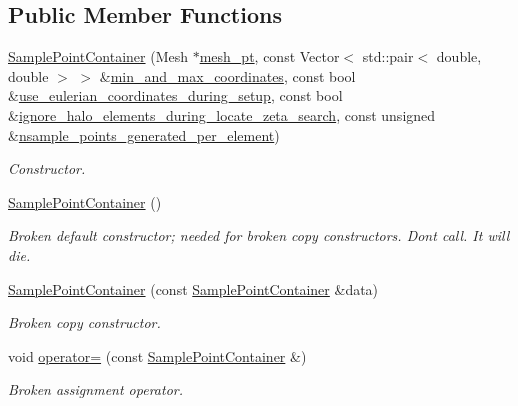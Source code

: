 \subsection*{Public Member Functions}
\begin{DoxyCompactItemize}
\item 
\hyperlink{classSamplePointContainer_a68326e89f80f01690d8c2d03effb8508}{Sample\+Point\+Container} (Mesh $\ast$\hyperlink{classSamplePointContainer_ae170916821b5f8f00255d251cd7f2d8c}{mesh\+\_\+pt}, const Vector$<$ std\+::pair$<$ double, double $>$ $>$ \&\hyperlink{classSamplePointContainer_a6799027f7c569176934457b17bfddf0f}{min\+\_\+and\+\_\+max\+\_\+coordinates}, const bool \&\hyperlink{classSamplePointContainer_a6b6b42a9e6bd8f116af8699e03a78d44}{use\+\_\+eulerian\+\_\+coordinates\+\_\+during\+\_\+setup}, const bool \&\hyperlink{classSamplePointContainer_a399d246c1afdfd993ceb80e6f2de1400}{ignore\+\_\+halo\+\_\+elements\+\_\+during\+\_\+locate\+\_\+zeta\+\_\+search}, const unsigned \&\hyperlink{classSamplePointContainer_a48e5ae762e0d56f67645ce4e7dd886d7}{nsample\+\_\+points\+\_\+generated\+\_\+per\+\_\+element})
\begin{DoxyCompactList}\small\item\em Constructor. \end{DoxyCompactList}\item 
\hyperlink{classSamplePointContainer_a6801f78c9d6b55a69f7e60a372dc9bf2}{Sample\+Point\+Container} ()
\begin{DoxyCompactList}\small\item\em Broken default constructor; needed for broken copy constructors. Don\textquotesingle{}t call. It will die. \end{DoxyCompactList}\item 
\hyperlink{classSamplePointContainer_ad4dd29301d0ce831f3d702527de951a8}{Sample\+Point\+Container} (const \hyperlink{classSamplePointContainer}{Sample\+Point\+Container} \&data)
\begin{DoxyCompactList}\small\item\em Broken copy constructor. \end{DoxyCompactList}\item 
void \hyperlink{classSamplePointContainer_a9b614945308f23a6852f9a38b8a85957}{operator=} (const \hyperlink{classSamplePointContainer}{Sample\+Point\+Container} \&)
\begin{DoxyCompactList}\small\item\em Broken assignment operator. \end{DoxyCompactList}\item 

\end{DoxyCompactItemize}
